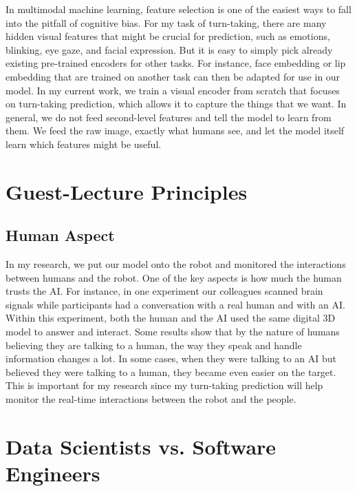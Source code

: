 \documentclass[11pt]{article}
\begin{document}
In multimodal machine learning, feature selection is one of the easiest ways to fall into the pitfall of cognitive bias. For my task of turn-taking, there are many hidden visual features that might be crucial for prediction, such as emotions, blinking, eye gaze, and facial expression. But it is easy to simply pick already existing pre-trained encoders for other tasks. For instance, face embedding or lip embedding that are trained on another task can then be adapted for use in our model. In my current work, we train a visual encoder from scratch that focuses on turn-taking prediction, which allows it to capture the things that we want. In general, we do not feed second-level features and tell the model to learn from them. We feed the raw image, exactly what humans see, and let the model itself learn which features might be useful.
\section{Guest-Lecture Principles}

\subsection{Human Aspect}
In my research, we put our model onto the robot and monitored the interactions between humans and the robot. One of the key aspects is how much the human trusts the AI. For instance, in one experiment our colleagues scanned brain signals while participants had a conversation with a real human and with an AI. Within this experiment, both the human and the AI used the same digital 3D model to answer and interact. Some results show that by the nature of humans believing they are talking to a human, the way they speak and handle information changes a lot. In some cases, when they were talking to an AI but believed they were talking to a human, they became even easier on the target. This is important for my research since my turn-taking prediction will help monitor the real-time interactions between the robot and the people.
\section{Data Scientists vs. Software Engineers}
\end{document}
